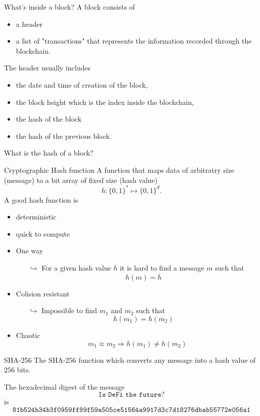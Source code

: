 \documentclass{beamer}
\begin{document}
\begin{frame}{What's inside a block?}
A block consists of 
\begin{itemize}
\item a header 
\item a list of "transactions" that represents the information recorded through the blockchain. 
\end{itemize}
The header usually includes 
\begin{itemize}
\item the date and time of creation of the block, 
\item the block height which is the index inside the blockchain, 
\item the hash of the block 
\item the hash of the previous block. 
\end{itemize}
\begin{tcolorbox}[enhanced,drop shadow, title=Question]
What is the hash of a block?
\end{tcolorbox}
\end{frame}
\begin{frame}{Cryptographic Hash function}
\small
A function that maps data of arbitratry size (message) to a bit array of fixed size (hash value)
$$
h:\{0,1\}^\ast\mapsto \{0,1\}^d. 
$$
A good hash function is
\begin{itemize}
\item deterministic
\item quick to compute
\item One way
\begin{itemize}
  \scriptsize
\item[$\hookrightarrow$] For a given hash value $\overline{h}$ it is hard to find a message $m$ such that 
$$
h(m) = \overline{h}
$$
\end{itemize}
\item Colision resistant 
\begin{itemize}
\item[$\hookrightarrow$] Impossible to find $m_1$ and $m_2$ such that 
$$
h(m_1) = h(m_2)
$$
\end{itemize}
\item Chaotic
$$m_1\approx m_2\Rightarrow  h(m_1) \neq h(m_2)$$
\end{itemize}
\end{frame}
\begin{frame}{SHA-256}
The SHA-256 function which converts any message into a hash value of $256$ bits.
\begin{tcolorbox}[enhanced,drop shadow, title=Example]
The hexadecimal digest of the message
$$
\texttt{Is DeFi the future?}
$$
is 
\footnotesize
$$
\texttt{81b524b34b3f0959ff89f59a505ce51564a9917d3c7d18276dbab55772e056a1}
$$
\end{tcolorbox}
\end{frame}
\end{document}
